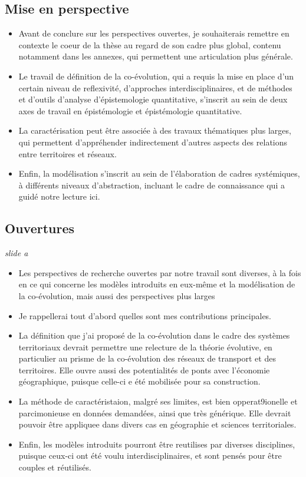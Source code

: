 \documentclass[12pt]{article}
\begin{document}
\newpage

\subsection*{Mise en perspective}

\begin{itemize}
	\item Avant de conclure sur les perspectives ouvertes, je souhaiterais remettre en contexte le coeur de la thèse au regard de son cadre plus global, contenu notamment dans les annexes, qui permettent une articulation plus générale.
	\item Le travail de définition de la co-évolution, qui a requis la mise en place d'un certain niveau de reflexivité, d'approches interdisciplinaires, et de méthodes et d'outils d'analyse d'épistemologie quantitative, s'inscrit au sein de deux axes de travail en épistémologie et épistémologie quantitative.
	\item La caractérisation peut être associée à des travaux thématiques plus larges, qui permettent d'appréhender indirectement d'autres aspects des relations entre territoires et réseaux.
	\item Enfin, la modélisation s'inscrit au sein de l'élaboration de cadres systémiques, à différents niveaux d'abstraction, incluant le cadre de connaissance qui a guidé notre lecture ici.
\end{itemize}


\newpage

\subsection*{Ouvertures}

\textit{slide a}

\begin{itemize}
	\item Les perspectives de recherche ouvertes par notre travail sont diverses, à la fois en ce qui concerne les modèles introduits en eux-même et la modélisation de la co-évolution, mais aussi des perspectives plus larges
	\item Je rappellerai tout d'abord quelles sont mes contributions principales.
	\item La définition que j'ai proposé de la co-évolution dans le cadre des systèmes territoriaux devrait permettre une relecture de la théorie évolutive, en particulier au prisme de la co-évolution des réseaux de transport et des territoires. Elle ouvre aussi des potentialités de ponts avec l'économie géographique, puisque celle-ci e été mobilisée pour sa construction.
	\item La méthode de caractéristaion, malgré ses limites, est bien opperat9ionelle et parcimonieuse en données demandées, ainsi que très générique. Elle devrait pouvoir être appliquee dans divers cas en géographie et sciences territoriales.
	\item Enfin, les modèles introduits pourront être reutilises par diverses disciplines, puisque ceux-ci ont été voulu interdisciplinaires, et sont pensés pour être couples et réutilisés.
\end{itemize}
\end{document}
